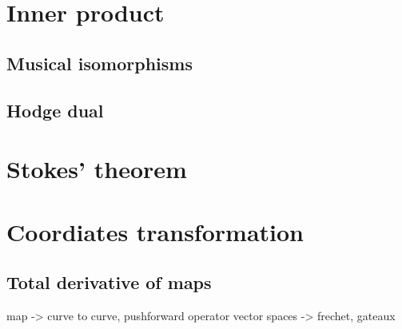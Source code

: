 \documentclass{../exp}
\begin{document}
\section{Inner product}
\subsection{Musical isomorphisms}
\subsection{Hodge dual}
















\section{Stokes' theorem}





\section{Coordiates transformation}
\subsection{Total derivative of maps}
map -> curve to curve, pushforward operator
vector spaces -> frechet, gateaux
\end{document}
